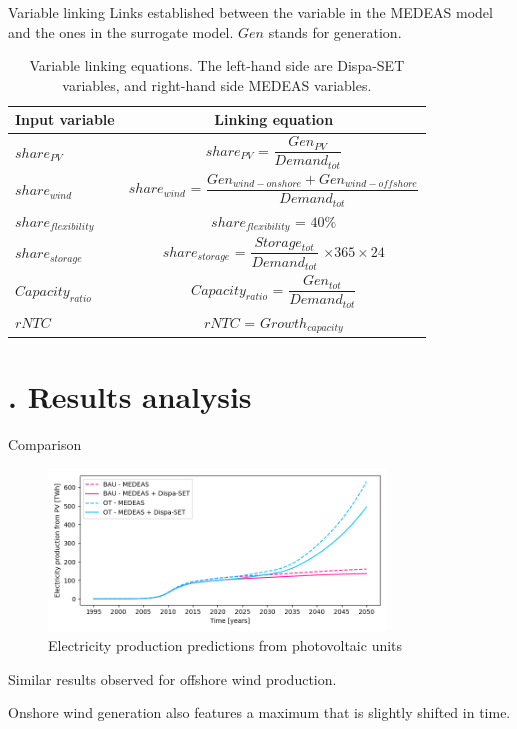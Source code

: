 \documentclass{beamer}
\newcommand{\mysection}[1]{\section{\thesection. #1}}
\begin{document}
    \begin{frame}{Variable linking}
        Links established between the variable in the MEDEAS model and the ones in the surrogate model. $Gen$ stands for generation.
        \begin{table}[h]
            \centering
            \begin{tabular}{|m{2.2cm}|c|}
            \hline 
            Input variable  & Linking equation \\ \hline
            {\color{blue} $share_{PV}$} & {\color{blue} $share_{PV}$ = \color{red} $\dfrac{Gen_{PV}}{Demand_{tot}}$ } \\ \hline 
            {\color{blue} $share_{wind}$} & {\color{blue} $share_{wind}$ = \color{red} $\dfrac{Gen_{wind-onshore} + Gen_{wind-offshore}}{Demand_{tot}}$} \\ \hline 
            {\color{blue} $share_{flexibility}$} & {\color{blue} $share_{flexibility}$} = $40\%$ \\ \hline 
            {\color{blue} $share_{storage}$} & {\color{blue} $share_{storage}$ = \color{red} $\dfrac{Storage_{tot}}{Demand_{tot}}$} $\times 365\times 24$ \\ \hline 
            {\color{blue} $Capacity_{ratio}$} & {\color{blue} $Capacity_{ratio}$ = \color{red} $\dfrac{Gen_{tot}}{Demand_{tot}}$} \\ \hline 
            {\color{blue} $rNTC$} & {\color{blue} $rNTC$ = \color{red} $Growth_{capacity}$} \\ \hline 
            \end{tabular}
            \caption{Variable linking equations. The left-hand side are Dispa-SET variables, and right-hand side MEDEAS variables.}
            \label{tab:linking-equations}
        \end{table}
    \end{frame}

    \mysection{Results analysis}

    \begin{frame}{Comparison}
        \begin{figure}[h]
            \centering
            \includegraphics[width=0.8\textwidth]{../resources/images/electricity-production_PV.png}
            \caption{Electricity production predictions from photovoltaic units}
            \label{fig:electricity-production-PV}
        \end{figure}
        Similar results observed for offshore wind production.

        Onshore wind generation also features a maximum that is slightly shifted in time.
    \end{frame}
\end{document}
